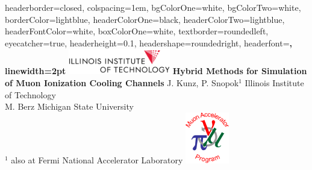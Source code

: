 \documentclass[portrait,a0paper,fontscale=0.285]{baposter} %
\begin{document}
\begin{poster}
{
headerborder=closed, %
colspacing=1em, %
bgColorOne=white, %
bgColorTwo=white, %
borderColor=lightblue, %
headerColorOne=black, %
headerColorTwo=lightblue, %
headerFontColor=white, %
boxColorOne=white, %
textborder=roundedleft, %
eyecatcher=true, %
headerheight=0.1\textheight, %
headershape=roundedright, %
headerfont=\Large\bf\textsc, %
linewidth=2pt %
}
%
{\includegraphics[height=3em]{Figures/IITlogo.png}} %
{\bf\huge{\hspace{-1.5in}Hybrid Methods for Simulation \\ \hspace{-1.5in}of Muon Ionization Cooling Channels}\vspace{0.1em}} %
{{ \large{\hspace{-1.5in}J. Kunz, P. Snopok$^1$ \hspace{12pt} Illinois Institute of Technology \\\hspace{-1.5in}M. Berz \hspace{12pt}Michigan State University \\\hspace{-1.5in}$^1$ also at Fermi National Accelerator Laboratory \vspace{-0.4em}}}}
{\includegraphics[height=6em]{Figures/MAPlogo.png}} %


\end{poster}
\end{document}
